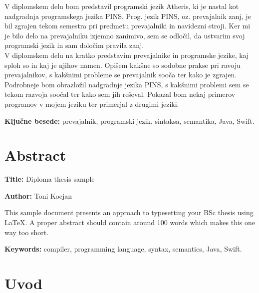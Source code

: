 \documentclass[a4paper, 12pt]{book}
\newcommand{\ttitleEn}{Diploma thesis sample}
\newcommand{\tauthor}{Toni Kocjan}
\newcommand{\tkeywords}{prevajalnik, programski jezik, sintaksa, semantika, Java, Swift}
\newcommand{\tkeywordsEn}{compiler, programming language, syntax, semantics, Java, Swift}
\newcommand{\clearemptydoublepage}{\newpage{\pagestyle{empty}\cleardoublepage}}
\begin{document}
V diplomskem delu bom predstavil programski jezik Atheris, ki je nastal kot nadgradnja programskega jezika PINS. Prog. jezik PINS, oz. prevajalnik zanj, je bil zgrajen tekom semestra pri predmetu prevajalniki in navidezni stroji. Ker mi je bilo delo na prevajalniku izjemno zanimivo, sem se odločil, da ustvarim svoj programski jezik in sam določim pravila zanj.\\
\indent V diplomskem delu na kratko predstavim prevajalnike in programske jezike, kaj sploh so in kaj je njihov namen. Opišem kakšne so sodobne prakse pri ravoju prevajalnikov, s kakšnimi probleme se prevajalnik sooča ter kako je zgrajen. \\
\indent Podrobneje bom obrazložil nadgradnje jezika PINS, s kakšnimi problemi sem se tekom razvoja soočal ter kako sem jih reševal. Pokazal bom nekaj primerov programov v mojem jeziku ter primerjal z drugimi jeziki.

\noindent 

\bigskip

\noindent\textbf{Ključne besede:} \tkeywords.
\clearemptydoublepage

\chapter*{Abstract}

\noindent\textbf{Title:} \ttitleEn
\bigskip

\noindent\textbf{Author:} \tauthor
\bigskip

\noindent This sample document presents an approach to typesetting your BSc thesis using \LaTeX. 
A proper abstract should contain around 100 words which makes this one way too short.
\bigskip

\noindent\textbf{Keywords:} \tkeywordsEn.
\clearemptydoublepage

\mainmatter
\setcounter{page}{1}
\pagestyle{fancy}

\chapter{Uvod}
\end{document}
